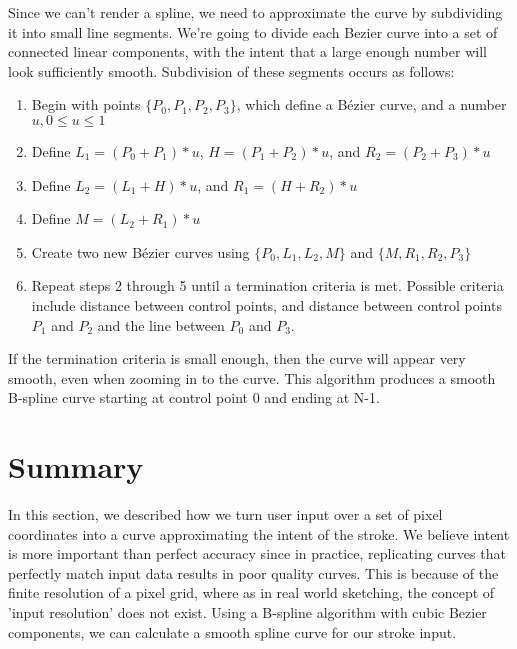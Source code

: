 Since we can't render a spline, we need to approximate the curve by subdividing it into small line segments.
We're going to divide each Bezier curve into a set of connected linear components, with the intent that a large enough number will look sufficiently smooth.
Subdivision of these segments occurs as follows:
\begin{enumerate}
\item Begin with points $\{P_0,P_1,P_2,P_3\}$, which define a Bézier curve, and a number $u, 0 \le u \le 1$
\item Define $L_1=(P_0 + P_1)*u$, $H=(P_1 + P_2)*u$, and $R_2=(P_2 + P_3)*u$
\item Define $L_2=(L_1 + H)*u$, and $R_1=(H + R_2)*u$
\item Define $M=(L_2 + R_1)*u$
\item Create two new Bézier curves using $\{P_0,L_1,L_2,M\}$ and $\{M,R_1,R_2,P_3\}$
\item Repeat steps 2 through 5 until a termination criteria is met. Possible criteria include distance between control points, and distance between control points $P_1$ and $P_2$ and the line between $P_0$ and $P_3$.
\end{enumerate}
If the termination criteria is small enough, then the curve will appear very smooth, even when zooming in to the curve.
This algorithm produces a smooth B-spline curve starting at control point 0 and ending at N-1.

\section{Summary}
In this section, we described how we turn user input over a set of pixel coordinates into a curve approximating the intent of the stroke.
We believe intent is more important than perfect accuracy since in practice, replicating curves that perfectly match input data results in poor quality curves.
This is because of the finite resolution of a pixel grid, where as in real world sketching, the concept of 'input resolution' does not exist.
Using a B-spline algorithm with cubic Bezier components, we can calculate a smooth spline curve for our stroke input.